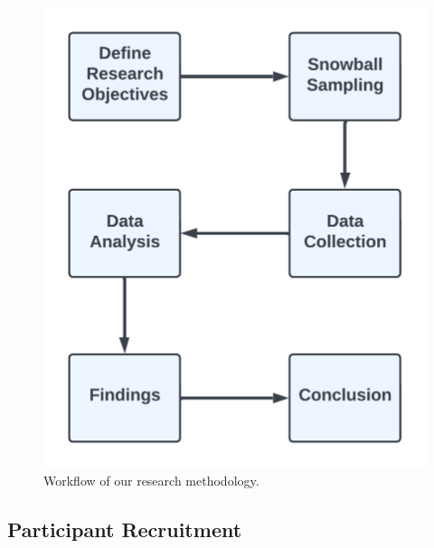 \documentclass[manuscript,screen,review,anonymous]{acmart}
\begin{document}
\begin{figure}[h]
  \centering
  \includegraphics[width=0.35\columnwidth]{CSE472 Paper}
  \caption{Workflow of our research methodology.}
  \label{fig:workflow}
\end{figure}

\subsection{Participant Recruitment}

\end{document}
